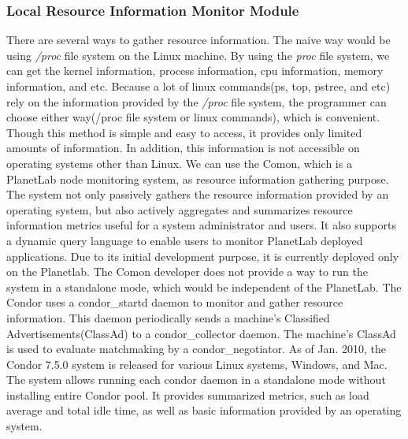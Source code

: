 \documentclass{acm_proc_article-sp}
\begin{document}
\subsubsection{Local Resource Information Monitor Module}
There are several ways to gather resource information. The naive way would be using \textit{/proc} file system on the Linux machine. 
By using the \textit{proc} file system, we can get the kernel information, process information, cpu information, memory information, and etc. 
Because a lot of linux commands(ps, top, pstree, and etc) rely on the information provided by the \textit{/proc} file system,  
the programmer can choose either way(/proc file system or linux commands), which is convenient. 
Though this method is simple and easy to access, it provides only limited amounts of information. In addition, this information is not accessible on operating systems other than Linux.
We can use the Comon\cite{comon}, which  is a PlanetLab\cite{planetlab} node monitoring system, as resource information gathering purpose. The system not only passively gathers the resource information
provided by an operating system, but also actively aggregates and summarizes resource information metrics useful for a system administrator and users. 
It also supports a dynamic query language to enable users to monitor PlanetLab deployed applications.
Due to its initial development purpose, it is currently deployed only on the Planetlab. The Comon developer does not provide a way to run the system in a standalone mode, which would be independent of the PlanetLab. 
The Condor\cite{condor} uses a condor\_startd daemon to monitor and gather resource information. 
This daemon periodically sends a machine's Classified Advertisements(ClassAd)\cite{classad} to a condor\_collector daemon. 
The machine's ClassAd is used to evaluate matchmaking by a condor\_negotiator. 
As of Jan. 2010, the Condor 7.5.0 system is released for various Linux systems, Windows, and Mac. The system allows running each condor daemon in a standalone mode without
installing entire Condor pool. It provides summarized metrics, such as load average and total idle time, as well as basic information provided by an operating system.
\end{document}
